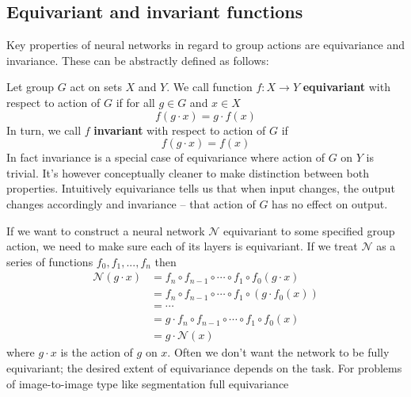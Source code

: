 \subsection{Equivariant and invariant functions}
    \label{sec:theoretical_equiinv}
    \hspace{0.5cm}
     Key properties of neural networks in regard to group actions are equivariance and invariance.
        These can be abstractly defined as follows: \par
        Let group $G$ act on sets $X$ and $Y$. We call function $f: X \rightarrow Y$
        \textbf{equivariant}
        with respect to action of $G$ if for all $g \in G$ and $x \in X$
        \begin{equation}
            f(g \cdot x) = g \cdot f(x)
        \end{equation}
        In turn, we call $f$ \textbf{invariant} with respect to action of $G$ if
        \begin{equation}
            f(g \cdot x) = f(x)
        \end{equation}
        In fact invariance is a special case of equivariance where action of $G$ on $Y$ is trivial.
        It's however conceptually cleaner to make distinction between both properties.
        Intuitively equivariance tells us that when input changes, the output changes accordingly
        and invariance -- that action of $G$ has no effect on output.\par
            If we want to construct a neural network $\mathcal{N}$ equivariant to some
        specified group action, we need to make sure each of its layers is equivariant.
        If we treat $\mathcal{N}$ as a series of functions $f_0,f_1,...,f_n$ then
        \begin{align*}
            \mathcal{N}(g \cdot x) &=
            f_n \circ f_{n-1} \circ \cdots \circ f_1 \circ f_0(g\cdot x)  \\
            &= f_n \circ f_{n-1} \circ \cdots \circ f_1 \circ \left( g \cdot f_0(x) \right) \\
            &= \cdots \\
            &= g \cdot f_n \circ f_{n-1} \circ \cdots \circ f_1 \circ f_0(x) \\
            &= g \cdot \mathcal{N}(x)
        \end{align*}
        where $g\cdot x$ is the action of $g$ on $x$. Often we don't want the network
        to be fully equivariant; the desired extent of equivariance depends on the task.
        For problems of image-to-image type like segmentation full equivariance
